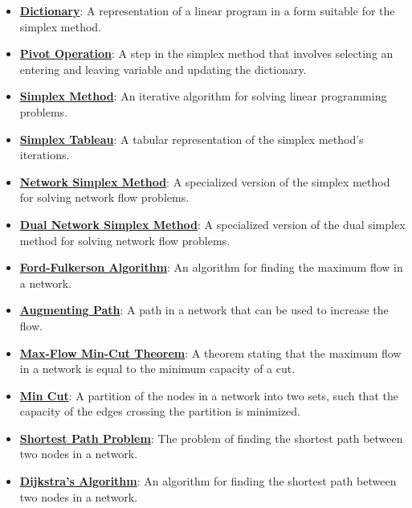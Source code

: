 \documentclass{article}%
\begin{document}
\begin{itemize}[leftmargin=*]
\item \href{https://www.math.purdue.edu/~yipn/421/2024-12-03-Duality.pdf#page=2}{\textbf{Dictionary}}: A representation of a linear program in a form suitable for the simplex method. %
\item \href{https://www.math.purdue.edu/~yipn/421/2024-12-03-Duality.pdf#page=1}{\textbf{Pivot Operation}}: A step in the simplex method that involves selecting an entering and leaving variable and updating the dictionary. %
\item \href{https://www.math.purdue.edu/~yipn/421/2024-12-03-Duality.pdf#page=1}{\textbf{Simplex Method}}: An iterative algorithm for solving linear programming problems. %
\item \href{https://www.math.purdue.edu/~yipn/421/2024-12-03-Duality.pdf#page=1}{\textbf{Simplex Tableau}}: A tabular representation of the simplex method's iterations. %
\item \href{https://www.math.purdue.edu/~yipn/421/2024-12-03-Duality.pdf#page=1}{\textbf{Network Simplex Method}}: A specialized version of the simplex method for solving network flow problems. %
\item \href{https://www.math.purdue.edu/~yipn/421/2024-12-03-Duality.pdf#page=1}{\textbf{Dual Network Simplex Method}}: A specialized version of the dual simplex method for solving network flow problems. %
\item \href{https://www.math.purdue.edu/~yipn/421/2024-12-03-Duality.pdf#page=1}{\textbf{Ford{-}Fulkerson Algorithm}}: An algorithm for finding the maximum flow in a network. %
\item \href{https://www.math.purdue.edu/~yipn/421/2024-12-03-Duality.pdf#page=1}{\textbf{Augmenting Path}}: A path in a network that can be used to increase the flow. %
\item \href{https://www.math.purdue.edu/~yipn/421/2024-12-03-Duality.pdf#page=1}{\textbf{Max{-}Flow Min{-}Cut Theorem}}: A theorem stating that the maximum flow in a network is equal to the minimum capacity of a cut. %
\item \href{https://www.math.purdue.edu/~yipn/421/2024-12-03-Duality.pdf#page=1}{\textbf{Min Cut}}: A partition of the nodes in a network into two sets, such that the capacity of the edges crossing the partition is minimized. %
\item \href{https://www.math.purdue.edu/~yipn/421/2024-12-03-Duality.pdf#page=1}{\textbf{Shortest Path Problem}}: The problem of finding the shortest path between two nodes in a network. %
\item \href{https://www.math.purdue.edu/~yipn/421/2024-12-03-Duality.pdf#page=1}{\textbf{Dijkstra's Algorithm}}: An algorithm for finding the shortest path between two nodes in a network. %

\end{itemize}
\end{document}
